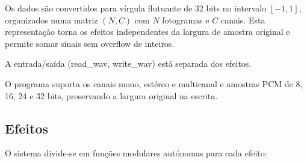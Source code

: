 \documentclass[11pt,a4paper]{report}
\begin{document}
Os dados são convertidos para vírgula flutuante de 32 bits no intervalo $[-1,1]$, organizados numa matriz $(N, C)$ com $N$ fotogramas e $C$ canais. Esta representação torna os efeitos independentes da largura de amostra original e permite somar sinais sem overflow de inteiros.

A entrada/saída (read\_wav, write\_wav) está separada dos efeitos.

 O programa suporta os canais mono, estéreo e multicanal e amostras PCM de 8, 16, 24 e 32 bits, preservando a largura original na escrita.

 \subsection{Efeitos}

O sistema divide-se em funções modulares autónomas para cada efeito:
\end{document}
